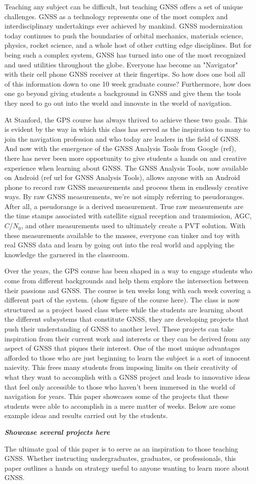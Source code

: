 \documentclass[12pt, conference, onecolumn, draftclsnofoot]{IEEEtran}
\begin{document}
Teaching any subject can be difficult, but teaching GNSS offers a set of unique challenges.
GNSS as a technology represents one of the most complex and interdisciplinary undertakings ever achieved by mankind.
GNSS modernization today continues to push the boundaries of orbital mechanics, materials science, physics, rocket science, and a whole host of other cutting edge disciplines.
But for being such a complex system, GNSS has turned into one of the most recognized and used utilities throughout the globe.
Everyone has become an "Navigator" with their cell phone GNSS receiver at their fingertips.
So how does one boil all of this information down to one 10 week graduate course?
Furthermore, how does one go beyond giving students a background in GNSS and give them the tools they need to go out into the world and innovate in the world of navigation.

At Stanford, the GPS course has always thrived to achieve these two goals.
This is evident by the way in which this class has served as the inspiration to many to join the navigation profession and who today are leaders in the field of GNSS.
And now with the emergence of the GNSS Analysis Tools from Google (ref), there has never been more opportunity to give students a hands on and creative experience when learning about GNSS.
The GNSS Analysis Tools, now available on Android (ref url for GNSS Analysis Tools), allows anyone with an Android phone to record raw GNSS measurements and process them in endlessly creative ways.
By raw GNSS measurements, we're not simply referring to pseudoranges.
After all, a pseudorange is a derived measurement.
True raw measurements are the time stamps associated with satellite signal reception and transmission, AGC, $C$/$N_0$, and other measurements used to ultimately create a PVT solution.
With these measurements available to the masses, everyone can tinker and toy with real GNSS data and learn by going out into the real world and applying the knowledge the garnered in the classroom.

Over the years, the GPS course has been shaped in a way to engage students who come from different backgrounds and help them explore the intersection between their passions and GNSS.
The course is ten weeks long with each week covering a different part of the system. (show figure of the course here).
The class is now structured as a project based class where while the students are learning about the different subsystems that constitute GNSS, they are developing projects that push their understanding of GNSS to another level.
These projects can take inspiration from their current work and interests or they can be derived from any aspect of GNSS that piques their interest.
One of the most unique advantages afforded to those who are just beginning to learn the subject is a sort of innocent naievity.
This frees many students from imposing limits on their creativity of what they want to accomplish with a GNSS project and leads to innovative ideas that feel only accessible to those who haven't been immersed in the world of navigation for years. 
This paper showcases some of the projects that these students were able to accomplish in a mere matter of weeks.
Below are some example ideas and results carried out by the students.

\textit{\textbf{Showcase several projects here}}

The ultimate goal of this paper is to serve as an inspiration to those teaching GNSS.
Whether instructing undergraduates, graduates, or professionals, this paper outlines a hands on strategy useful to anyone wanting to learn more about GNSS.
\end{document}
